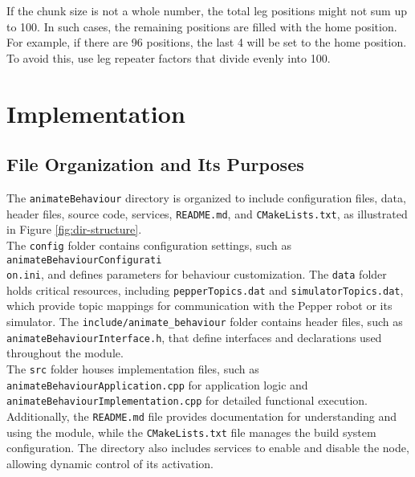 \documentclass{CSSRforAfrica}
\begin{document}
\begin{tcolorbox}[colback=yellow!20,colframe=yellow!50!black,title=NOTE]
If the chunk size is not a whole number, the total leg positions might not sum up to 100. In such cases, the remaining positions are filled with the home position. For example, if there are 96 positions, the last 4 will be set to the home position. To avoid this, use leg repeater factors that divide evenly into 100.
\end{tcolorbox}

\newpage
\section{Implementation}
\subsection*{File Organization and Its Purposes}  
The \texttt{animateBehaviour} directory is organized to include configuration files, data, header files, source code, services, \texttt{README.md}, and \texttt{CMakeLists.txt}, as illustrated in Figure \ref{fig:dir-structure}. 
\\[1em] 
The \texttt{config} folder contains configuration settings, such as \texttt{animateBehaviourConfigurati}\\
\texttt{on.ini}, and defines parameters for behaviour customization. The \texttt{data} folder holds critical resources, including \texttt{pepperTopics.dat} and \texttt{simulatorTopics.dat}, which provide topic mappings for communication with the Pepper robot or its simulator. The \texttt{include/animate\_behaviour} folder contains header files, such as \texttt{animateBehaviourInterface.h}, that define interfaces and declarations used throughout the module.\\[1em] 
The \texttt{src} folder houses implementation files, such as \texttt{animateBehaviourApplication.cpp} for application logic and \texttt{animateBehaviourImplementation.cpp} for detailed functional execution. Additionally, the \texttt{README.md} file provides documentation for understanding and using the module, while the \texttt{CMakeLists.txt} file manages the build system configuration. The directory also includes services to enable and disable the node, allowing dynamic control of its activation.
\end{document}
